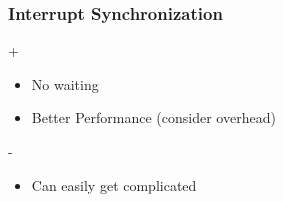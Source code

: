 \begin{frame}
    \frametitle{Interrupt Synchronization}
	\begin{exampleblock}{+}
        \begin{itemize}
			\item No waiting
			\item Better Performance (consider overhead)         
    	\end{itemize}
   	\end{exampleblock}	
	\begin{alertblock}{-}    
    	\begin{itemize}
			\item Can easily get complicated
	     \end{itemize}
	\end{alertblock}
        
\end{frame}